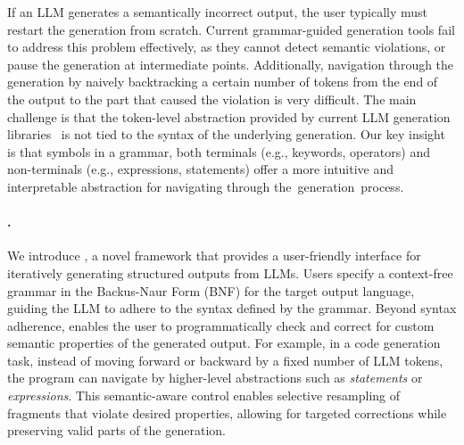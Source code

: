 If an LLM generates a semantically incorrect output, the user typically must restart the generation from scratch.
Current grammar-guided generation tools fail to address this problem effectively, as they cannot detect semantic violations, or pause the generation at intermediate points. 
Additionally, navigation through the generation by naively backtracking a certain number of tokens from the end of the output to the part that caused the violation is very difficult. The main challenge is that the token-level abstraction provided by current LLM generation libraries~\cite{wolf-etal-2020-transformers, llamacpp} is not tied to the syntax of the underlying generation. 
%
%
Our key insight is that symbols in a grammar, both terminals (e.g., keywords, operators) and non-terminals (e.g., expressions, statements)
offer a more intuitive and interpretable abstraction for navigating through \mbox{the generation process.}




\paragraph{\Tool{}.} 
We introduce \Tool{}, a novel framework that provides a user-friendly interface for iteratively generating structured outputs from LLMs. 
Users specify a context-free grammar in the Backus-Naur Form (BNF) for the target output language, guiding the LLM to adhere to the syntax defined by the grammar.
%
Beyond syntax adherence, \Tool{} enables the user to programmatically check and correct for custom semantic properties of the generated output.
For example, in a code generation task, instead of moving forward or backward by a fixed number of LLM tokens, the \Tool{} program can navigate by higher-level abstractions such as \textit{statements} or \textit{expressions}.
This semantic-aware control enables selective resampling of fragments that violate desired properties, allowing for targeted corrections while preserving valid parts of the generation.


